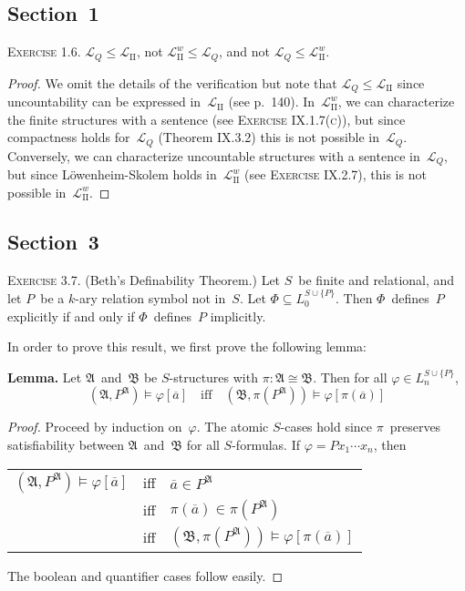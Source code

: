 \documentclass[letterpaper]{article}
\newcommand{\iso}{\cong}
\newcommand{\union}{\cup}
\newcommand{\A}{\mathfrak{A}}
\newcommand{\B}{\mathfrak{B}}
\renewcommand{\L}{\mathcal{L}}
\newcommand{\Ls}{\L_{\mathrm{II}}}
\newcommand{\Lsw}{\Ls^w}
\newcommand{\Lq}{\L_Q}
\theoremstyle{remark}
\begin{document}
\subsection*{Section~1}
\noindent\textsc{Exercise 1.6.}
$\Lq\le\Ls$, not $\Lsw\le\Lq$, and not $\Lq\le\Lsw$.
\begin{proof}
We omit the details of the verification but note that $\Lq\le\Ls$ since uncountability can be expressed in~$\Ls$ (see p.~140). In~$\Lsw$, we can characterize the finite structures with a sentence (see \textsc{Exercise IX.1.7(c)}), but since compactness holds for~$\Lq$ (Theorem IX.3.2) this is not possible in~$\Lq$. Conversely, we can characterize uncountable structures with a sentence in~$\Lq$, but since L\"owenheim-Skolem holds in~$\Lsw$ (see \textsc{Exercise IX.2.7}), this is not possible in~$\Lsw$.
\end{proof}

\subsection*{Section~3}
\noindent\textsc{Exercise 3.7.}
(Beth's Definability Theorem.) Let $S$~be finite and relational, and let $P$~be a $k$-ary relation symbol not in~$S$. Let $\Phi\subseteq L_0^{S\union\{P\}}$. Then $\Phi$~defines~$P$ explicitly if and only if $\Phi$~defines~$P$ implicitly.

In order to prove this result, we first prove the following lemma:

\noindent\textbf{Lemma.} Let $\A$~and~$\B$ be $S$-structures with $\pi:\A\iso\B$. Then for all $\varphi\in L_n^{S\union\{P\}}$,
$$(\A,P^{\A})\models\varphi[\overline{a}]\quad\text{iff}\quad(\B,\pi(P^{\A}))\models\varphi[\pi(\overline{a})]$$
\begin{proof}
Proceed by induction on~$\varphi$. The atomic $S$-cases hold since $\pi$~preserves satisfiability between $\A$~and~$\B$ for all $S$-formulas. If $\varphi=Px_1\cdots x_n$, then
\begin{center}
\begin{tabular}{rcl}
$(\A,P^{\A})\models\varphi[\overline{a}]$&iff&$\overline{a}\in P^{\A}$\\
	&iff&$\pi(\overline{a})\in\pi(P^{\A})$\\
	&iff&$(\B,\pi(P^{\A}))\models\varphi[\pi(\overline{a})]$
\end{tabular}
\end{center}
The boolean and quantifier cases follow easily.
\end{proof}
\end{document}

